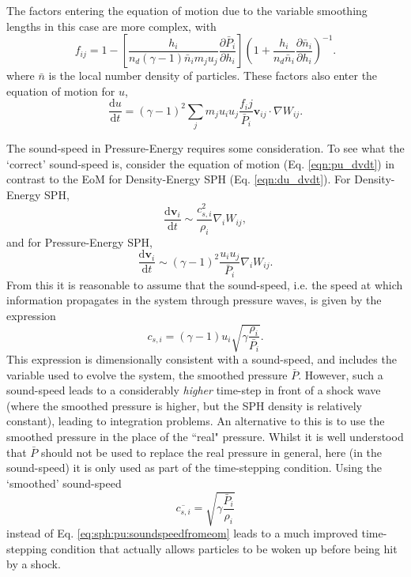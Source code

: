 The factors entering the equation of motion due to the variable smoothing
lengths in this case are more complex, with
\begin{equation}
    f_{ij} = 1 - \left[\frac{h_i}{n_d (\gamma - 1) \bar{n}_i m_j u_j}
             \frac{\partial \bar{P}_i}{\partial h_i} \right]
             \left( 1 + \frac{h_i}{n_d \bar{n}_i}
             \frac{\partial \bar{n}_i}{\partial h_i} \right)^{-1}.
\end{equation}
where $\bar{n}$ is the local number density of particles. These factors
also enter the equation of motion for $u$,
\begin{equation}
    \frac{\mathrm{d} u}{\mathrm{d} t} = (\gamma - 1)^2 \sum_j m_j
    u_i u_j \frac{f_ij}{\bar{P}_i} \mathbf{v}_{ij} \cdot \nabla W_{ij}.
    \label{eqn:pu_dudt}
\end{equation}

The sound-speed in Pressure-Energy requires some consideration. To see what
the `correct' sound-speed is, consider the equation of motion (Eq.
\ref{eqn:pu_dvdt}) in contrast to the EoM for Density-Energy SPH (Eq.
\ref{eqn:du_dvdt}). For Density-Energy SPH,
\begin{equation}
  \frac{\mathrm{d}\mathbf{v}_i}{\mathrm{d} t} \sim \frac{c_{s, i}^2}{\rho_i}
\nabla_i W_{ij},
  \nonumber
\end{equation}
and for Pressure-Energy SPH,
\begin{equation}
  \frac{\mathrm{d}\mathbf{v}_i}{\mathrm{d} t} \sim (\gamma - 1)^2
  \frac{u_i u_j}{\bar{P}_i} \nabla_i W_{ij}.
  \nonumber
\end{equation}
From this it is reasonable to assume that the sound-speed, i.e. the speed at
which information propagates in the system through pressure waves, is given by
the expression
\begin{equation}
  c_{s, i} = (\gamma - 1) u_i \sqrt{\gamma \frac{\rho_i}{\bar{P_i}}}.
  \label{eq:sph:pu:soundspeedfromeom}
\end{equation}
This expression is dimensionally consistent with a sound-speed, and includes
the variable used to evolve the system, the smoothed pressure $\bar{P}$.
However, such a sound-speed leads to a considerably \emph{higher} time-step
in front of a shock wave (where the smoothed pressure is higher, but the SPH
density is relatively constant), leading to integration problems. An
alternative to this is to use the smoothed pressure in the place of the
``real" pressure. Whilst it is well understood that $\bar{P}$ should not be
used to replace the real pressure in general, here (in the sound-speed) it is
only used as part of the time-stepping condition. Using the `smoothed' sound-speed
\begin{equation}
  \overline{c_{s, i}} = \sqrt{\gamma \frac{\bar{P}_i}{\rho_i}}
  \label{eq:sph:pu:soundspeed}
\end{equation}
instead of Eq. \ref{eq:sph:pu:soundspeedfromeom} leads to a much improved
time-stepping condition that actually allows particles to be woken up before
being hit by a shock.


